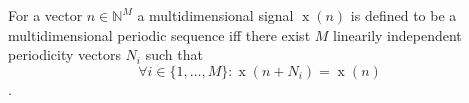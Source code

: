 For a vector $n \in \mathbb{N}^M$ a multidimensional signal $\operatorname{x}(n)$ is defined to be a multidimensional periodic sequence iff there exist $M$ linearily independent periodicity vectors $N_i$ such that
$$\forall i \in \{1, \dots, M\} : \operatorname{x}(n + N_i) = \operatorname{x}(n)$$.
